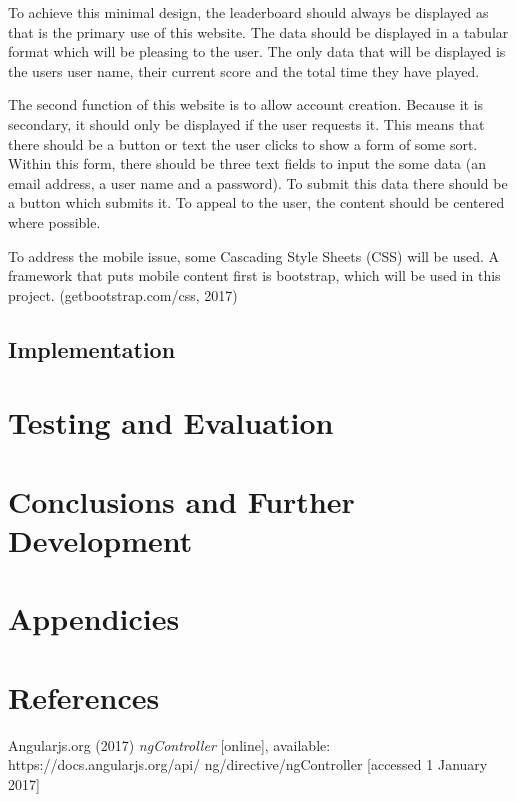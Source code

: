 \documentclass[12pt]{article}
\begin{document}
To achieve this minimal design, the leaderboard should always be displayed as that is the primary use of this website. The data should be displayed in a tabular format which will be pleasing to the user. The only data that will be displayed is the users user name, their current score and the total time they have played. 

The second function of this website is to allow account creation. Because it is secondary, it should only be displayed if the user requests it. This means that there should be a button or text the user clicks to show a form of some sort. Within this form, there should be three text fields to input the some data (an email address, a user name and a password). To submit this data there should be a button which submits it. To appeal to the user, the content should be centered where possible.

To address the mobile issue, some Cascading Style Sheets (CSS) will be used. A framework that puts mobile content first is bootstrap, which will be used in this project.  (getbootstrap.com/css, 2017)

\newpage
\begin{center}
\section{Implementation}
\end{center}

\newpage
{\centering \section{Testing and Evaluation}}

\newpage
{\centering \section{Conclusions and Further Development}}

\newpage
{\centering \section{Appendicies}}

\newpage
{\centering \section{References}}
Angularjs.org (2017) \textit{ngController} [online], available: https://docs.angularjs.org/api/
\hangindent=0.5in ng/directive/ngController [accessed 1 January 2017]
\end{document}
